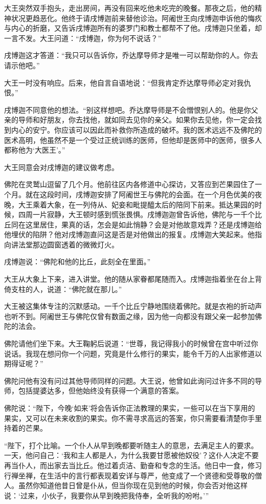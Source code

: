 \documentclass[12pt,twoside,openany]{book}
\begin{document}
大王突然双手抱头，走出房间，再没有回来吃他未吃完的晚餐。那夜之后，他的精神状况更趋恶化。他终于请戌博迦前来替他诊治。阿阇世王向戌博迦申诉他的悔疚与内心的折磨，又告诉戌博迦所有的婆罗门和教士都帮不了他。戌博迦只坐着，却一言不发。大王问道：“戌博迦，你为何不说话？”

戌博迦这才答道：“我只可以告诉你，乔达摩导师才是唯一可以帮助你的人。你去请示他吧。”

大王一时没有响应。后来，他自言自语地说：“但我肯定乔达摩导师必定对我仇恨。”

戌博迦不同意他的想法。“别这样想吧。乔达摩导师是不会憎恨别人的。他是你父亲的导师和好朋友，你去找他，就如同去见你的亲父。如果你去见他，你一定会找到内心的安宁。你应该可以因此而补救你所造成的破坏。我的医术远远不及佛陀的医术高明，他虽然不是一个受过正统训练的医师，但他却是医师中的医师，很多人都称他为‘大医王’。”

大王同意会对戌博迦的建议做考虑。

佛陀在灵鹫山逗留了几个月。他前往区内各修道中心探访，又答应到芒果园住了一个月。就在这段时间，戌博迦安排了阿阇世王与佛陀的会面。在一个月色优美的夜晚，大王乘着大象，在一列侍从、妃妾和毗提醯太后的陪同下前来。抵达果园的时候，四周一片寂静，大王顿时感到慌张畏惧。戌博迦迦曾告诉他，佛陀与一千个比丘同在这里居住，果真的话，怎会是如此悄静？会是对他故意戏弄？还是戌博迦给他埋伏的陷阱？他对戌博迦直问这是否是对他做出的报复。戌博迦大笑起来。他指向讲法堂那边圆窗透着的微微灯火。

戌博迦说：“佛陀和他的比丘，此刻全在里面。”

大王从大象上下来，进入讲堂。他的随从家眷都尾随而入。戌博迦指着坐在台上背倚支柱的人，说道：“佛陀就在那儿。”

大王被这集体专注的沉默感动。一千个比丘宁静地围绕着佛陀。就是衣袍的折动声也听不到。阿阇世王与佛陀仅曾有数面之缘，因为他一向都没有跟父亲一起参加佛陀的法会。

佛陀请他们坐下来。大王鞠躬后说道：“世尊，我记得我小的时候曾在宫中听过你说话。我现在想问你一个问题，究竟是什么修行的果实，能令千万的人出家修道以期得证呢？”

佛陀问他有没有问过其他导师同样的问题。大王说，他曾如此询问过许多不同的导师，包括提婆达多，但他始终没有获得一个满意的答案。

佛陀说：“陛下，今晚‘如来’将会告诉你正法教理的果实，一些可以在当下享用的果实，又可以在未来收割的果实。你不需寻求高远的答案，你只需要看清楚你手里持着的芒果。

“陛下，打个比喻。一个仆人从早到晚都要听随主人的意思，去满足主人的要求。一天，他问自己：‘我和主人都是人，为什么我要甘愿被他奴役’？这仆人决定不要再当仆人，而出家去当比丘。他过着贞洁、勤奋和专念的生活。他日中一食，修习行禅坐禅，在生活中的言行都表现着安详与尊严，他变成了一个贤德和受尊敬的僧人。虽然你知道他昔日曾是仆从，但当你现在见到他的时候，你会否对他这样说：‘过来，小伙子，我要你从早到晚把我侍奉，全听我的吩咐。’”
\end{document}
